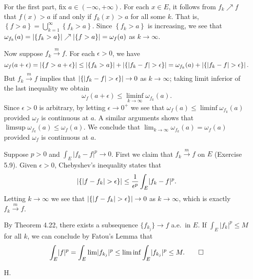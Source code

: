 \begin{exercise}{4.18}
  For the first part, fix $a \in (-\infty, +\infty)$.
  For each $x \in E$,
  it follows from $f_k \nearrow f$ that
  $f(x) > a$ if and only if $f_k(x) > a$ for all some $k$.
  That is, $\left\{ f > a \right\} = \bigcup_{k=1}^{\infty} \left\{ f_k > a \right\}$.
  Since $\left\{ f_k > a \right\}$ is increasing,
  we see that $\omega_{f_k}(a) = \left\vert\left\{ f_k > a \right\}\right\vert \nearrow
  \left\vert\left\{ f > a \right\}\right\vert = \omega_f(a)$ as $k \rightarrow \infty$.

  Now suppose $f_k \xrightarrow{m} f$.
  For each $\epsilon > 0$, we have
  \[
    \omega_f(a + \epsilon) = \left\vert\left\{ f > a + \epsilon \right\}\right\vert \le
    \left\vert\left\{ f_k > a \right\}\right\vert + \left\vert\left\{ \lvert f_k - f \rvert > \epsilon \right\}\right\vert
    = \omega_{f_k}(a) + \left\vert\left\{ \lvert f_k - f \rvert > \epsilon \right\}\right\vert.
  \]
  But $f_k \xrightarrow{m} f$ implies that
  $\left\vert\left\{ \lvert f_k - f \rvert > \epsilon \right\}\right\vert \rightarrow 0$
  as $k \rightarrow \infty$;
  taking limit inferior of the last inequality we obtain
  \[
    \omega_f(a + \epsilon) \le \liminf_{k \rightarrow \infty} \omega_{f_k}(a).
  \]
  Since $\epsilon > 0$ is arbitrary,
  by letting $\epsilon \rightarrow 0^+$ we see that
  $\omega_f(a) \le \liminf \omega_{f_k}(a)$
  provided $\omega_f$ is continuous at $a$.
  A similar arguments shows that $\limsup \omega_{f_k}(a) \le \omega_f(a)$.
  We conclude that $\lim_{k \rightarrow \infty} \omega_{f_k}(a) = \omega_f(a)$
  provided $\omega_f$ is continuous at $a$.
\end{exercise}

\begin{exercise}{5.10}
  Suppose $p > 0$ and $\int_E \lvert f_k - f \rvert^p \rightarrow 0$.
  First we claim that $f_k \xrightarrow{m} f$ on $E$ (Exercise 5.9).
  Given $\epsilon > 0$, Chebyshev's inequality states that
  \[
    \left\vert\left\{ \lvert f - f_k \rvert > \epsilon \right\}\right\vert
    \le \frac{1}{\epsilon^p} \int_E \lvert f_k - f \rvert^p.
  \]
  Letting $k \rightarrow \infty$
  we see that $\left\vert\left\{ \lvert f - f_k \rvert > \epsilon \right\}\right\vert \rightarrow 0$
  as $k \rightarrow \infty$,
  which is exactly $f_k \xrightarrow{m} f$.

  By Theorem 4.22, there exists a subsequence $\{f_{k_j}\} \rightarrow f$ a.e.\ in $E$.
  If $\int_E \lvert f_k \rvert^p \le M$ for all $k$,
  we can conclude by Fatou's Lemma that
  \[
    \int_E \lvert f \rvert^p = \int_E \lim \lvert f_{k_j} \rvert^p
    \le \liminf \int_E \lvert f_{k_j} \rvert^p \le M.
    \qedhere
  \]
\end{exercise}

\begin{exercise}{5.18}
  H.
\end{exercise}
